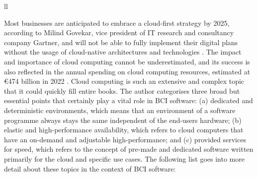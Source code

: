 \begin{table}[!ht]
{\begin{tabular}{ll}
       \\ \hline
    \end{tabular}%
  }
  \vspace{10pt}
  \caption[The three abstraction levels and types of cloud computing.]{The three abstraction levels and types of cloud computing \citep{amazon_web_services_inc_what_nodate}.}
  \vspace{-5pt}
  \label{tab:cloud-computing-types}
\end{table}

Most businesses are anticipated to embrace a cloud-first strategy by 2025, according to Milind Govekar, vice president of IT research and consultancy company Gartner, and will not be able to fully implement their digital plans without the usage of cloud-native architectures and technologies  \citep{gartner_gartner_nodate}. The impact and importance of cloud computing cannot be underestimated, and its success is also reflected in the annual spending on cloud computing resources, estimated at €474 billion in 2022 \citep{gartner_gartner_nodate}. Cloud computing is such an extensive and complex topic that it could quickly fill entire books. The author categorises three broad but essential points that certainly play a vital role in BCI software: (a) dedicated and deterministic environments, which means that an environment of a software programme always stays the same independent of the end-users hardware; (b) elastic and high-performance availability, which refers to cloud computers that have an on-demand and adjustable high-performance; and (c) provided services for speed, which refers to the concept of pre-made and dedicated software written primarily for the cloud and specific use cases. The following list goes into more detail about these topics in the context of BCI software:

